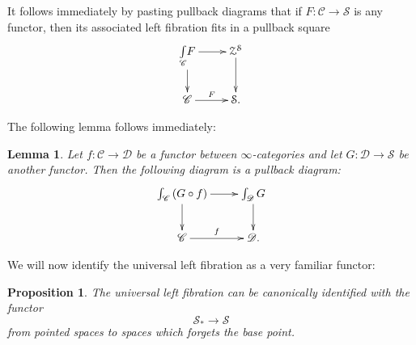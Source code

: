 \documentclass[12pt]{amsart}
\newtheorem{lemma}[dummy]{Lemma}
\newtheorem{proposition}[dummy]{Proposition}
\theoremstyle{definition}
\newcommand{\cS}{\mathcal{S}}
\newcommand{\cZ}{\mathcal{Z}}
\newcommand{\sC}{\mathscr{C}}
\newcommand{\sD}{\mathscr{D}}
\renewcommand{\i}{\infty}
\begin{document}
It follows immediately by pasting pullback diagrams that if $F:\sC \to \cS$ is any functor, then its associated left fibration fits in a pullback square
$$\xymatrix{\underset{\sC} \int F \ar[d] \ar[r] & \cZ^\cS \ar[d]\\
\sC \ar[r]^-{F} & \cS.}$$

The following lemma follows immediately:

\begin{lemma}\label{lem:pbfib}
Let $f:\sC \to \sD$ be a functor between $\i$-categories and let $G:\sD \to \cS$ be another functor. Then the following diagram is a pullback diagram:
$$\xymatrix{ \int_\sC \left(G \circ f\right) \ar[d] \ar[r] & \int_\sD G \ar[d]\\
\sC \ar[r]^-{f} & \sD.}$$
\end{lemma}

We will now identify the universal left fibration as a very familiar functor:

\begin{proposition}
The universal left fibration can be canonically identified with the functor $$\cS_{\ast} \to \cS$$ from pointed spaces to spaces which forgets the base point.
\end{proposition}
\end{document}

